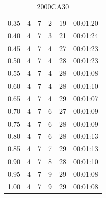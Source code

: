 \documentclass[review]{elsarticle}
\begin{document}
\begin{table}[H]
\begin{subtable}[h]{0.45\textwidth}
{\begin{tabular}{@{}cccccc@{}}
                        0.35 & 4 & 7 & 2 & 19 & 00:01.20 \\
                        0.40 & 4 & 7 & 3 & 21 & 00:01:24 \\
                        0.45 & 4 & 7 & 4 & 27 & 00:01:23 \\
                        0.50 & 4 & 7 & 4 & 28 & 00:01:23 \\
                        0.55 & 4 & 7 & 4 & 28 & 00:01:08 \\
                        0.60 & 4 & 7 & 4 & 28 & 00.01:10 \\
                        0.65 & 4 & 7 & 4 & 29 & 00:01:07 \\
                        0.70 & 4 & 7 & 6 & 27 & 00:01:09 \\
                        0.75 & 4 & 7 & 6 & 28 & 00:01:09 \\
                        0.80 & 4 & 7 & 6 & 28 & 00:01:13 \\
                        0.85 & 4 & 7 & 7 & 29 & 00:01:13 \\
                        0.90 & 4 & 7 & 8 & 28 & 00:01:10 \\
                        0.95 & 4 & 7 & 9 & 29 & 00:01:08 \\
                        1.00 & 4 & 7 & 9 & 29 & 00:01:08 \\
        \end{tabular}
        }
        \caption{2000CA30}
        \label{tab:2000CA30_hmax}
    \end{subtable}
    \hfill
    \begin{subtable}[h]{0.45\textwidth}
        \centering
\end{subtable}
\end{table}
\end{document}
